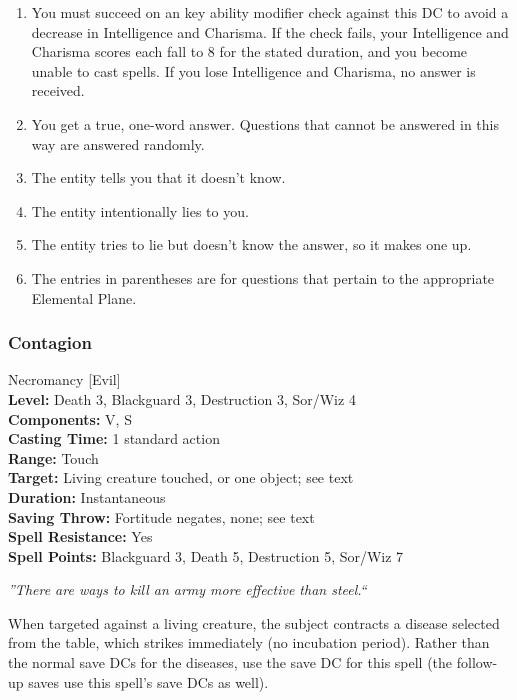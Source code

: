 \begin{table}
{\begin{tabular*}{\textwidth}{@{\extracolsep{\fill}}|llllll|}
\end{tabular*}}
\begin{enumerate}
 \small
 \item You must succeed on an key ability modifier check against this DC to avoid a decrease in Intelligence and Charisma. 
If the check fails, your Intelligence and Charisma scores each fall to 8 for the stated duration, 
and you become unable to cast spells. If you lose Intelligence and Charisma, no answer is received.
 \item You get a true, one-word answer. Questions that cannot be answered in this way are answered randomly.
 \item The entity tells you that it doesn't know.
 \item The entity intentionally lies to you.
 \item The entity tries to lie but doesn't know the answer, so it makes one up.
 \item The entries in parentheses are for questions that pertain to the appropriate Elemental Plane.
\end{enumerate}

\end{table}

\subsubsection{Contagion}
\label{Spell:Contagion}
Necromancy [Evil]
\\ \textbf{Level:} Death 3, Blackguard 3, Destruction 3, Sor/Wiz 4
\\ \textbf{Components:} V, S
\\ \textbf{Casting Time:} 1 standard action
\\ \textbf{Range:} Touch
\\ \textbf{Target:} Living creature touched, or one object; see text
\\ \textbf{Duration:} Instantaneous
\\ \textbf{Saving Throw:} Fortitude negates, none; see text
\\ \textbf{Spell Resistance:} Yes
\\ \textbf{Spell Points:} Blackguard 3, Death 5, Destruction 5, Sor/Wiz 7

\emph{''There are ways to kill an army more effective than steel.``}

When targeted against a living creature, the subject contracts a disease selected from the  table, which strikes immediately (no incubation period).
Rather than the normal save DCs for the diseases, use the save DC for this spell (the follow-up saves use this spell's save DCs as well). 


